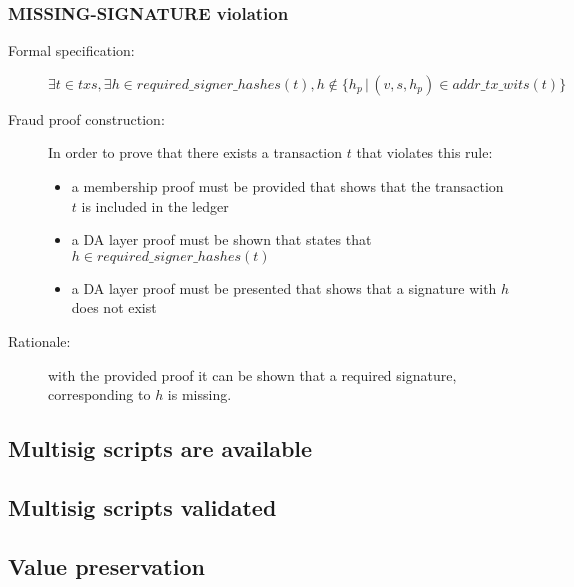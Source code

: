 \documentclass[../midgard.tex]{subfiles}
\begin{document}
\subsubsection{MISSING-SIGNATURE violation}
\label{violation:MISSING-SIGNATURE}

\begin{description}

\item[Formal specification:]
\begin{equation*}
    \exists t \in txs, \exists h \in required\_signer\_hashes(t), h \notin \{ h_p \, | \, (v, s, h_p) \in addr\_tx\_wits(t) \}
\end{equation*}

\item[Fraud proof construction:] In order to prove that there exists a transaction $t$ that violates this rule:
\begin{itemize}
    \item a membership proof must be provided that shows that the transaction $t$ is included in the ledger
    \item a DA layer proof must be shown that states that $h \in required\_signer\_hashes(t)$
    \item a DA layer proof must be presented that shows that a signature with $h$ does not exist
\end{itemize}

\item[Rationale:] with the provided proof it can be shown that a required signature, corresponding to $h$ is missing.

\end{description}

\subsection{Multisig scripts are available}
\label{rule:multisig-scripts-are-available}

\subsection{Multisig scripts validated}
\label{rule:multisig-scripts-validated}

\subsection{Value preservation}
\label{rule:value-preservation}
\end{document}
